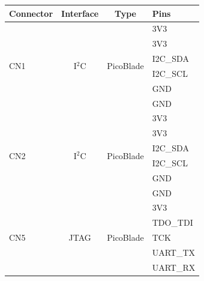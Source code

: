 \begin{table}[!htb]
    \centering
    \label{tab:icd}
    \begin{tabular}{lccl}
        \toprule[1.5pt]
        \textbf{Connector} & \textbf{Interface} & \textbf{Type} & \textbf{Pins} \\
        \midrule
        \multirow{6}{*}{CN1} & \multirow{6}{*}{I$^{2}$C} & \multirow{6}{*}{PicoBlade} & 3V3 \\
                             &                           &                            & 3V3 \\
                             &                           &                            & I2C\_SDA \\
                             &                           &                            & I2C\_SCL \\
                             &                           &                            & GND \\
                             &                           &                            & GND \\
        \midrule
        \multirow{6}{*}{CN2} & \multirow{6}{*}{I$^{2}$C} & \multirow{6}{*}{PicoBlade} & 3V3 \\
                             &                           &                            & 3V3 \\
                             &                           &                            & I2C\_SDA \\
                             &                           &                            & I2C\_SCL \\
                             &                           &                            & GND \\
                             &                           &                            & GND \\
        \midrule
        \multirow{6}{*}{CN5} & \multirow{6}{*}{JTAG} & \multirow{6}{*}{PicoBlade} & 3V3 \\
                             &                       &                            & TDO\_TDI \\
                             &                       &                            & TCK \\
                             &                       &                            & UART\_TX \\
                             &                       &                            & UART\_RX \\

\end{tabular}
\end{table}

